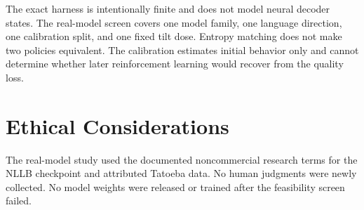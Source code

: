 \documentclass[11pt]{article}
\begin{document}
The exact harness is intentionally finite and does not model neural decoder
states.  The real-model screen covers one model family, one language direction,
one calibration split, and one fixed tilt dose.  Entropy matching does not make
two policies equivalent.  The calibration estimates initial behavior only and
cannot determine whether later reinforcement learning would recover from the
quality loss.

\section*{Ethical Considerations}

The real-model study used the documented noncommercial research terms for the
NLLB checkpoint and attributed Tatoeba data.  No human judgments were newly
collected.  No model weights were released or trained after the feasibility
screen failed.


\end{document}
